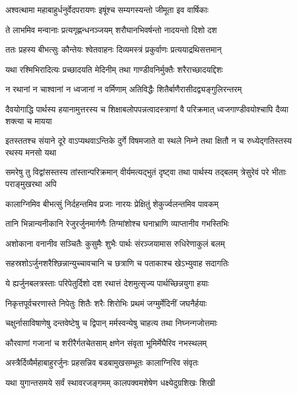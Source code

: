 \twolineshloka
{अश्वत्थामा महाबाहुर्धनुर्वेदपरायणः}
{इषूंश्च सम्यगस्यन्तो जीमूता इव वार्षिकाः}


\twolineshloka
{ते लाभमिव मन्वानाः प्रत्यगृह्णन्धनञ्जयम्}
{शरौघानभिवर्षन्तो नादयन्तो दिशो दश}


\twolineshloka
{ततः प्रहस्य बीभत्सुः कौन्तेयः श्वेतवाहनः}
{दिव्यमस्त्रं प्रकुर्वाणः प्रत्ययाद्रथिसत्तमान्}


\twolineshloka
{यथा रश्मिभिरादित्यः प्रच्छादयति मेदिनीम्}
{तथा गाण्डीवनिर्मुक्तैः शरैराच्छादयद्दिशः}


\twolineshloka
{न रथानां न चाश्वानां न ध्वजानां न वर्मिणाम्}
{अतिविद्धैः शितैर्बाणैरासीदद्व्यङ्गुलिरन्तरम्}


\threelineshloka
{दैवयोगाद्धि पार्थस्य हयानामुत्तरस्य च}
{शिक्षाबलोपपन्नत्वादस्त्राणां वै परिक्रमात्}
{ध्वजगाण्डीवयोश्चापि दैव्या शक्त्या च मायया}


\threelineshloka
{इतस्ततश्च संयाने दूरे वाऽप्यथवाऽन्तिके}
{दुर्गे विषमजाते वा स्थले निम्ने तथा क्षितौ}
{न च रुध्येद्गतिस्तस्य रथस्य मनसो यथा}


\threelineshloka
{समरेषु तु विद्वांसस्तस्य तांस्तान्परिक्रमान्}
{वीर्यमत्यद्भुतं दृष्ट्वा तथा पार्थस्य तद्बलम्}
{त्रेसुरेवं परे भीताः पराङ्मुखरथा अपि}


\twolineshloka
{कालाग्निमिव बीभत्सुं निर्दहन्तमिव प्रजाः}
{नारयः प्रेक्षितुं शेकुर्ज्वलन्तमिव पावकम्}


\twolineshloka
{तानि भिन्नान्यनीकानि रेजुरर्जुनमार्गणैः}
{तिग्मांशोश्च घनाभ्राणि व्याप्तानीव गभस्तिभिः}


\twolineshloka
{अशोकाना वनानीव सञ्चितैः कुसुमैः शुभैः}
{पार्थः संरञ्जयामास रुधिरेणाकुलं बलम्}


\twolineshloka
{सहस्रशोऽर्जुनशरैश्छिन्नान्युच्चावचानि च}
{छत्राणि च पताकाश्च खेऽभ्युवाह सदागतिः}


\twolineshloka
{ये ह्यर्जुनबलत्रस्ताः परिपेतुर्दिशो दश}
{रथात्तं देशमुत्सृज्य पार्थच्छिन्नयुगा हयाः}


\twolineshloka
{निकृत्तपूर्वचरणास्ते निपेतुः शितैः शरैः}
{शिरोभिः प्रथमं जग्मुर्मेदिनीं जघनैर्हयाः}


\twolineshloka
{चक्षुर्नासाविषाणेषु दन्तवेष्टेषु च द्विपान्}
{मर्मस्वन्येषु चाहत्य तथा निघ्नन्गजोत्तमाः}


\twolineshloka
{कौरवाणां गजानां च शरीरैर्गतचेतसाम्}
{क्षणेन संवृता भूमिर्मेघैरिव नभस्थलम्}


\twolineshloka
{अस्त्रैर्दिव्यैर्महाबाहुरर्जुनः प्रहसन्निव}
{बडबामुखसम्भूतः कालाग्निरिव संवृतः}


\twolineshloka
{यथा युगान्तसमये सर्वं स्थावरजङ्गमम्}
{कालपक्वमशेषेण धक्ष्येदुग्रशिखः शिखी}



